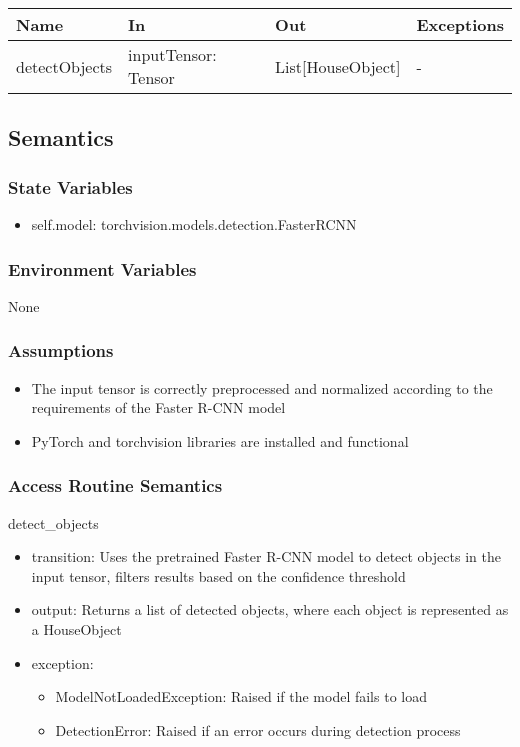 \documentclass[12pt, titlepage]{article}
\begin{document}
\begin{center}
\begin{tabular}{p{5cm} p{3cm} p{3cm} p{2cm}}
\hline
\textbf{Name} & \textbf{In} & \textbf{Out} & \textbf{Exceptions} \\
\hline
detectObjects & inputTensor: Tensor & List[HouseObject] & - \\
\hline
\end{tabular}
\end{center}

\subsection{Semantics}

\subsubsection{State Variables}
\begin{itemize}
	\item self.model: torchvision.models.detection.FasterRCNN
\end{itemize}


\subsubsection{Environment Variables}
None

\subsubsection{Assumptions}
\begin{itemize}
  \item The input tensor is correctly preprocessed and normalized according to the requirements of the Faster R-CNN model
  \item PyTorch and torchvision libraries are installed and functional
\end{itemize}


\subsubsection{Access Routine Semantics}

\noindent detect{\_}objects
\begin{itemize}
\item transition: Uses the pretrained Faster R-CNN model to detect objects in the input tensor, filters results based on the confidence threshold
\item output: Returns a list of detected objects, where each object is represented as a HouseObject
\item exception: 
\begin{itemize}
  \item ModelNotLoadedException: Raised if the model fails to load
  \item DetectionError: Raised if an error occurs during detection process
\end{itemize}

\end{itemize}
\end{document}

